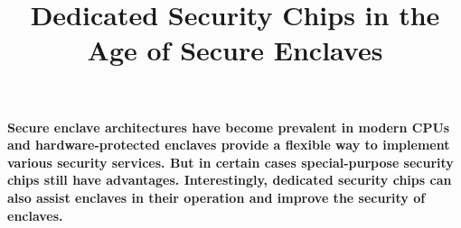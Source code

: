 

\graphicspath{{images/}}

\title{Dedicated Security Chips in the Age of Secure Enclaves} 


\maketitle
\thispagestyle{empty}

{\bfseries
Secure enclave architectures have become prevalent in modern CPUs and hardware-protected enclaves provide a flexible way to implement various security services. But in certain cases special-purpose security chips still have advantages. Interestingly, dedicated security chips can also assist enclaves in their operation and improve the security of enclaves.}








{\small
%

}


